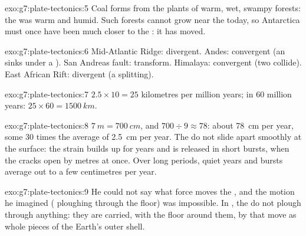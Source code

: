 \begin{solution}{exo:g7:plate-tectonics:5}
Coal forms from the plants of warm, wet, swampy forests: the  was
warm and humid. Such forests cannot grow near the  today, so
Antarctica must once have been much closer to the : it has moved.
\end{solution}

\begin{solution}{exo:g7:plate-tectonics:6}
Mid-Atlantic Ridge: divergent. Andes: convergent (an   sinks
under a ). San Andreas fault: transform. Himalaya: convergent (two
 collide). East African Rift: divergent (a  splitting).
\end{solution}

\begin{solution}{exo:g7:plate-tectonics:7}
$2.5 \times 10 = 25$ kilometres per million years; in 60 million years:
$25 \times 60 = \qty{1500}{km}$.
\end{solution}

\begin{solution}{exo:g7:plate-tectonics:8}
$\qty{7}{m} = \qty{700}{cm}$, and $700 \div 9 \approx 78$: about
\qty{78}{cm} per year, some 30 times the average of \qty{2.5}{cm} per year.
The  do not slide apart smoothly at the surface: the strain builds up
for years and is released in short bursts, when the cracks open by metres
at once. Over long periods, quiet years and bursts average out to a few
centimetres per year.
\end{solution}

\begin{solution}{exo:g7:plate-tectonics:9}
He could not say what force moves the , and the motion he
imagined ( ploughing through the  floor) was impossible.
In , the  do not plough through anything: they are
carried, with the  floor around them, by  that move as whole
pieces of the Earth's outer shell.
\end{solution}

